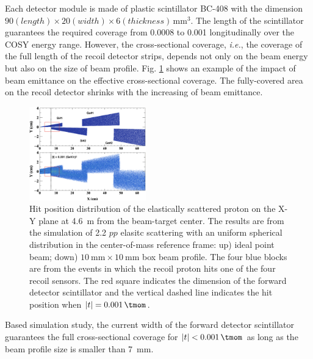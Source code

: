 \documentclass[number,5p]{elsarticle}
\begin{document}
Each detector module is made of plastic scintillator BC-408 \cite{bc408} with the dimension $90 (length) \times 20 (width) \times 6
(thickness)\,\si{\mm\tothe{3}}$.
The length of the scintillator guarantees the required coverage
from \SI{0.0008}{\tmom} to \SI{0.001}{\tmom} longitudinally over the COSY energy range.
However, the cross-sectional coverage, \textit{i.e.}, the coverage of the full length of
the recoil detector strips, depends not only on the beam energy but also on the
size of beam profile.
Fig. \ref{fig:forward_acceptance} shows an example of the impact of beam emittance on the
effective cross-sectional coverage.
The fully-covered area on the recoil detector shrinks with the increasing of beam emittance. 
\begin{figure}[htbp]
  \centering
  \includegraphics[width=0.45\textwidth]{./fwd_acceptance.png}
  \caption{
    Hit position distribution of the elastically scattered proton on the X-Y plane at \SI{4.6}{\meter}
    from the beam-target center. The results are from the simulation of \SI{2.2}{\momentum}
    $pp$ elasitc scattering with an uniform spherical distribution in the
    center-of-mass reference frame: up) ideal point beam; down) $\SI{10}{\mm}\times\SI{10}{\mm}$ box beam profile.
    The four blue blocks are from the events in which the recoil proton hits one of
    the four recoil sensors.
    The red square indicates the dimension of the forward detector scintillator
    and the vertical dashed line indicates the hit position when $|t| = \SI{0.001}{\tmom}$.}
  \label{fig:forward_acceptance}
\end{figure}
Based simulation study, the current width of the forward detector scintillator guarantees the
full cross-sectional coverage for $|t| < \SI{0.001}{\tmom}$ as long as the beam profile size is smaller than \SI{7}{\mm}.
\end{document}
